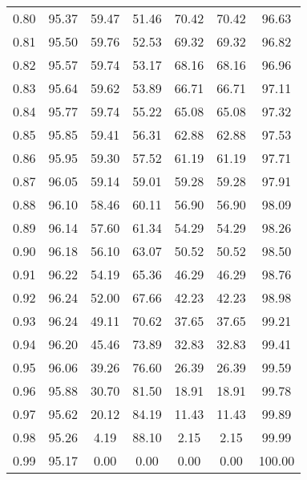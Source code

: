 \begin{tabular}{|c|c|c|c|c|c|c|}
      0.80 &     95.37 &     59.47 &      51.46 &   70.42 &      70.42 &         96.63 \\
      0.81 &     95.50 &     59.76 &      52.53 &   69.32 &      69.32 &         96.82 \\
      0.82 &     95.57 &     59.74 &      53.17 &   68.16 &      68.16 &         96.96 \\
      0.83 &     95.64 &     59.62 &      53.89 &   66.71 &      66.71 &         97.11 \\
      0.84 &     95.77 &     59.74 &      55.22 &   65.08 &      65.08 &         97.32 \\
      0.85 &     95.85 &     59.41 &      56.31 &   62.88 &      62.88 &         97.53 \\
      0.86 &     95.95 &     59.30 &      57.52 &   61.19 &      61.19 &         97.71 \\
      0.87 &     96.05 &     59.14 &      59.01 &   59.28 &      59.28 &         97.91 \\
      0.88 &     96.10 &     58.46 &      60.11 &   56.90 &      56.90 &         98.09 \\
      0.89 &     96.14 &     57.60 &      61.34 &   54.29 &      54.29 &         98.26 \\
      0.90 &     96.18 &     56.10 &      63.07 &   50.52 &      50.52 &         98.50 \\
      0.91 &     96.22 &     54.19 &      65.36 &   46.29 &      46.29 &         98.76 \\
      0.92 &     96.24 &     52.00 &      67.66 &   42.23 &      42.23 &         98.98 \\
      0.93 &     96.24 &     49.11 &      70.62 &   37.65 &      37.65 &         99.21 \\
      0.94 &     96.20 &     45.46 &      73.89 &   32.83 &      32.83 &         99.41 \\
      0.95 &     96.06 &     39.26 &      76.60 &   26.39 &      26.39 &         99.59 \\
      0.96 &     95.88 &     30.70 &      81.50 &   18.91 &      18.91 &         99.78 \\
      0.97 &     95.62 &     20.12 &      84.19 &   11.43 &      11.43 &         99.89 \\
      0.98 &     95.26 &      4.19 &      88.10 &    2.15 &       2.15 &         99.99 \\
      0.99 &     95.17 &      0.00 &       0.00 &    0.00 &       0.00 &        100.00 \\
\bottomrule
\end{tabular}
